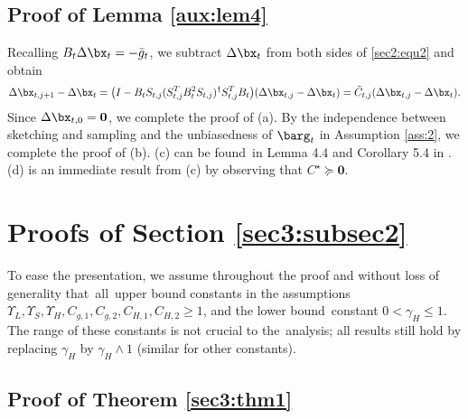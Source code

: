 \subsection{Proof of Lemma \ref{aux:lem4}}

Recalling $B_t\Delta\bx_t = -\bar{g}_t$, we subtract $\Delta\bx_t$ from both sides of \eqref{sec2:equ2} and obtain
\begin{equation*}
\Delta\bx_{t,j+1}-\Delta\bx_t =\big(I-B_tS_{t,j}(S_{t,j}^TB_t^2S_{t,j})^{\dagger}S_{t,j}^TB_t\big)(\Delta\bx_{t,j}-\Delta\bx_t) = \tilde{C}_{t,j}(\Delta\bx_{t,j}-\Delta\bx_t).
\end{equation*}
Since $\Delta\bx_{t,0}=\boldsymbol{0}$, we complete the proof of (a). By the independence between sketching and sampling and the unbiasedness of $\barg_t$ in Assumption \ref{ass:2}, we complete the proof of (b). (c) can be found~in Lemma 4.4 and Corollary 5.4 in \cite{Na2022Statistical}. (d) is an immediate result from (c) by observing that $C^\star\succeq \boldsymbol{0}$.


\section{Proofs of Section \ref{sec3:subsec2}}\label{pf:sec3:subsec2}

To ease the presentation, we assume throughout the proof and without loss of generality that~all~upper bound constants in the assumptions $\Upsilon_L,\Upsilon_{S}, \Upsilon_H, C_{g,1}, C_{g,2}, C_{H,1}, C_{H,2} \geq 1$, and the lower bound~constant $0<\gamma_H\leq 1$. The range of these constants is not crucial to the~analysis; all results still hold by replacing $\gamma_H$ by $\gamma_H\wedge 1$ (similar for other constants).



\subsection{Proof of Theorem \ref{sec3:thm1}}\label{pf:sec3:thm1}

